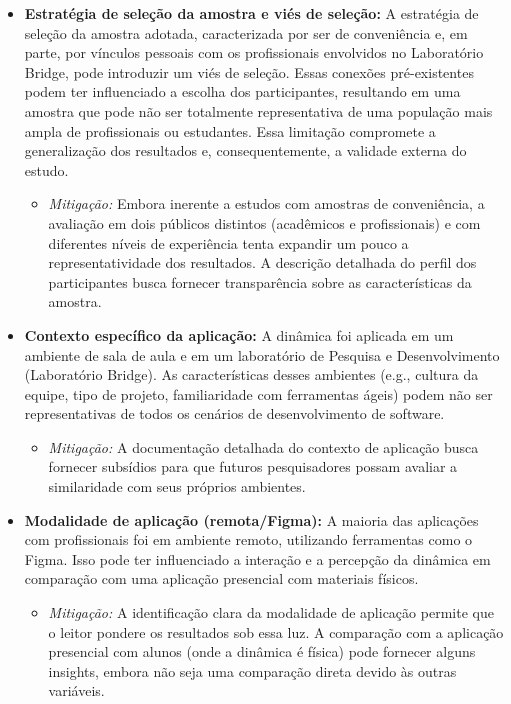 \documentclass[
	12pt,
	openright,
	twoside,
	a4paper,
	english,
	brazil
	]{abntex2}
\begin{document}
\begin{itemize}
  \item \textbf{Estratégia de seleção da amostra e viés de seleção:} A estratégia de seleção da amostra adotada, caracterizada por ser de conveniência e, em parte, por vínculos pessoais com os profissionais envolvidos no Laboratório Bridge, pode introduzir um viés de seleção. Essas conexões pré-existentes podem ter influenciado a escolha dos participantes, resultando em uma amostra que pode não ser totalmente representativa de uma população mais ampla de profissionais ou estudantes. Essa limitação compromete a generalização dos resultados e, consequentemente, a validade externa do estudo.
    \begin{itemize}
    \item \textit{Mitigação:} Embora inerente a estudos com amostras de conveniência, a avaliação em dois públicos distintos (acadêmicos e profissionais) e com diferentes níveis de experiência tenta expandir um pouco a representatividade dos resultados. A descrição detalhada do perfil dos participantes busca fornecer transparência sobre as características da amostra.
    \end{itemize}
  \item \textbf{Contexto específico da aplicação:} A dinâmica foi aplicada em um ambiente de sala de aula e em um laboratório de Pesquisa e Desenvolvimento (Laboratório Bridge). As características desses ambientes (e.g., cultura da equipe, tipo de projeto, familiaridade com ferramentas ágeis) podem não ser representativas de todos os cenários de desenvolvimento de software.
    \begin{itemize}
    \item \textit{Mitigação:} A documentação detalhada do contexto de aplicação busca fornecer subsídios para que futuros pesquisadores possam avaliar a similaridade com seus próprios ambientes.
    \end{itemize}
  \item \textbf{Modalidade de aplicação (remota/Figma):} A maioria das aplicações com profissionais foi em ambiente remoto, utilizando ferramentas como o Figma. Isso pode ter influenciado a interação e a percepção da dinâmica em comparação com uma aplicação presencial com materiais físicos.
    \begin{itemize}
    \item \textit{Mitigação:} A identificação clara da modalidade de aplicação permite que o leitor pondere os resultados sob essa luz. A comparação com a aplicação presencial com alunos (onde a dinâmica é física) pode fornecer alguns insights, embora não seja uma comparação direta devido às outras variáveis.
    \end{itemize}
\end{itemize}
\end{document}

